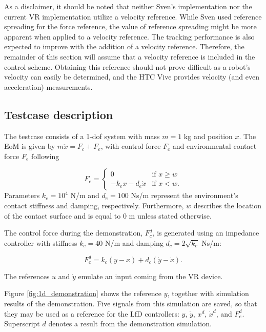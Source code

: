 \documentclass[11pt]{report}
\numberwithin{equation}{section}        %
\numberwithin{figure}{section}          %
\numberwithin{table}{section}           %
\begin{document}
  As a disclaimer, it should be noted that neither Sven's implementation nor the current VR implementation utilize a velocity reference. While Sven used reference spreading for the force reference, the value of reference spreading might be more apparent when applied to a velocity reference. The tracking performance is also expected to improve with the addition of a velocity reference. Therefore, the remainder of this section will assume that a velocity reference is included in the control scheme. Obtaining this reference should not prove difficult as a robot's velocity can easily be determined, and the HTC Vive provides velocity (and even acceleration) measurements.

  \subsection{Testcase description}
  The testcase consists of a 1-dof system with mass $m=1$ kg and position $x$. The EoM is given by $m\ddot{x}=F_c+F_e$, with control force $F_c$ and environmental contact force $F_e$ following

  $$F_e=\begin{cases}
    0 & \text{if } x\geq w\\
    -k_e x-d_e \dot{x}               & \text{if } x<w.
  \end{cases}$$
  Parameters $k_e=10^4$ N/m and $d_e=100$ Ns/m represent the environment's contact stiffness and damping, respectively. Furthermore, $w$ describes the location of the contact surface and is equal to $0$ m unless stated otherwise.

  The control force during the demonstration, $F_c^d$, is generated using an impedance controller with stiffness $k_c=40$ N/m and damping $d_c=2\sqrt{k_c}$ Ns/m:

  $$ F_c^d = k_c(y-x)+d_c(\dot{y}-\dot{x}).$$

  The references $u$ and $\dot{y}$ emulate an input coming from the VR device.

  Figure \ref{fig:1d_demonstration} shows the reference $y$, together with simulation results of the demonstration. Five signals from this simulation are saved, so that they may be used as a reference for the LfD controllers: $y$, $\dot{y}$, $x^d$, $\dot{x}^d$, and $F_e^d$. Superscript $d$ denotes a result from the demonstration simulation.
\end{document}
